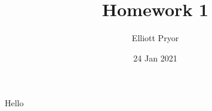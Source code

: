 \documentclass[11pt]{article}
\title{Homework 1}
\author{Elliott Pryor}
\date{24 Jan 2021}
\begin{document}
\maketitle

\newpage
Hello
\end{document}
